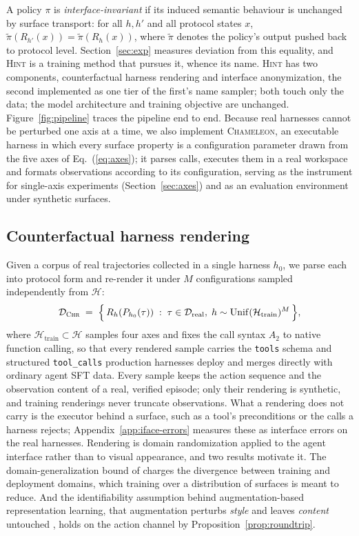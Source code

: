 \documentclass{article} %
\newcommand{\method}{\textsc{Hint}}
\newcommand{\chr}{\textsc{Chr}}
\newcommand{\cham}{\textsc{Chameleon}}
\begin{document}
A policy $\pi$ is \emph{interface-invariant} if its induced semantic behaviour
is unchanged by surface transport: for all $h, h'$ and all protocol states $x$,
$\tilde{\pi}\!\left(R_{h'}(x)\right) = \tilde{\pi}\!\left(R_{h}(x)\right)$, where
$\tilde\pi$ denotes the policy's output pushed back to protocol level.
Section~\ref{sec:exp} measures deviation from this equality, and \method{} is
a training method that pursues it, whence its name. \method{} has
two components, counterfactual harness rendering and interface anonymization,
the second implemented as one tier of the first's name sampler; both touch
only the data; the model architecture and training objective are unchanged. Figure~\ref{fig:pipeline} traces the pipeline end to end.
Because real harnesses cannot be perturbed one axis at a time, we also
implement \cham{}, an executable harness in which every surface property is a
configuration parameter drawn from the five axes of Eq.~(\ref{eq:axes}); it
parses calls, executes them in a real workspace and formats observations
according to its configuration, serving as the instrument for single-axis
experiments (Section~\ref{sec:axes}) and as an evaluation environment under
synthetic surfaces.

\subsection{Counterfactual harness rendering}
\label{sec:chr}

Given a corpus of real trajectories collected in a single harness $h_0$, we
parse each into protocol form and re-render it under $M$ configurations sampled
independently from $\mathcal{H}$:
\begin{equation}
\mathcal{D}_{\chr{}} \;=\;
\Big\{\, R_{h}\!\left(P_{h_0}(\tau)\right) \;:\;
\tau \in \mathcal{D}_{\text{real}},\;
h \sim \mathrm{Unif}(\mathcal{H}_{\mathrm{train}})^{M} \,\Big\},
\end{equation}
where $\mathcal{H}_{\mathrm{train}} \subset \mathcal{H}$ samples four axes and
fixes the call syntax $A_2$ to native function calling, so that every rendered
sample carries the \texttt{tools} schema and structured \texttt{tool\_calls}
production harnesses deploy and merges directly with ordinary agent SFT data.
Every sample keeps the action sequence and the observation content of a
real, verified episode; only their rendering is synthetic, and training
renderings never truncate observations. What a rendering does not carry is
the executor behind a surface, such as a tool's preconditions or the calls a
harness rejects; Appendix~\ref{app:iface-errors} measures these as interface
errors on the real harnesses. Rendering is domain randomization
\citep{tobin2017domain} applied to the agent interface rather than to visual
appearance, and two results motivate it. The domain-generalization bound of
\citet{benda2010theory} charges the divergence between training and deployment
domains, which training over a distribution of surfaces is meant to reduce.
And the identifiability assumption behind augmentation-based representation
learning, that augmentation perturbs \emph{style} and leaves \emph{content}
untouched \citep{kugelgen2021self}, holds on the action channel by
Proposition~\ref{prop:roundtrip}.
\end{document}
